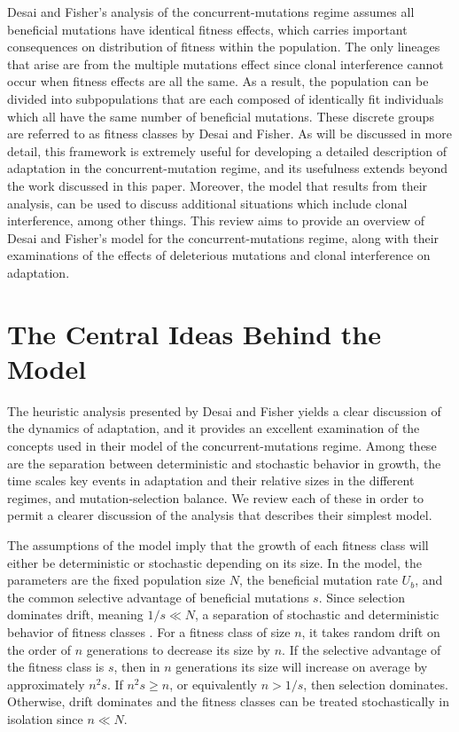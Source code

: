 \documentclass[12pt, two column]{article}
\begin{document}
Desai and Fisher's analysis of the concurrent-mutations regime assumes all beneficial mutations have identical fitness effects, which carries important consequences on distribution of fitness within the population.  The only lineages that arise are from the multiple mutations effect since clonal interference cannot occur when fitness effects are all the same.  As a result, the population can be divided into subpopulations that are each composed of identically fit individuals which all have the same number of beneficial mutations.  These discrete groups are referred to as fitness classes by Desai and Fisher.  As will be discussed in more detail, this framework is extremely useful for developing a detailed description of adaptation in the concurrent-mutation regime, and its usefulness extends beyond the work discussed in this paper.  Moreover, the model that results from their analysis, can be used to discuss additional situations which include clonal interference, among other things.  This review aims to provide an overview of Desai and Fisher's model for the concurrent-mutations regime, along with their examinations of the effects of deleterious mutations and clonal interference on adaptation.

\section*{The Central Ideas Behind the Model}
The heuristic analysis presented by Desai and Fisher yields a clear discussion of the dynamics of adaptation, and it provides an excellent examination of the concepts used in their model of the concurrent-mutations regime.  Among these are the separation between deterministic and stochastic behavior in growth, the time scales key events in adaptation and their relative sizes in the different regimes, and mutation-selection balance.  We review each of these in order to permit a clearer discussion of the analysis that describes their simplest model.     

The assumptions of the model imply that the growth of each fitness class will either be deterministic or stochastic depending on its size.  In the model, the parameters are the fixed population size $N$, the beneficial mutation rate $U_b$, and the common selective advantage of beneficial mutations $s$.  Since selection dominates drift, meaning $1/s \ll N$, a separation of stochastic and deterministic behavior of fitness classes .  For a fitness class of size $n$, it takes random drift on the order of $n$ generations to decrease its size by $n$.  If the selective advantage of the fitness class is $s$, then in $n$ generations its size will increase on average by approximately $n^2s$.  If $n^2s \ge n$, or equivalently $n>1/s$, then selection dominates.  Otherwise, drift dominates and the fitness classes can be treated stochastically in isolation since $n \ll N$.  
\end{document}
